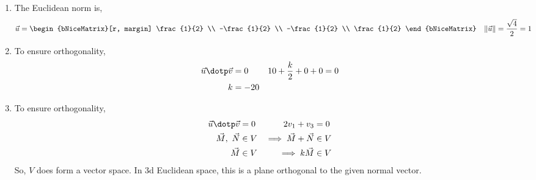 \begin{enumerate}
    \item The Euclidean norm is,
          \begin{align}
              \vec{u}               & = \begin{bNiceMatrix}[r, margin]
                                            \frac{1}{2}  \\ -\frac{1}{2} \\
                                            -\frac{1}{2} \\ \frac{1}{2}
                                        \end{bNiceMatrix} &
              \lVert \vec{u} \rVert & = \frac{\sqrt{4}}{2} = 1
          \end{align}

    \item To ensure orthogonality,
          \begin{align}
              \vec{u} \dotp \vec{v}    & = 0   &
              10 + \frac{k}{2} + 0 + 0 & = 0     \\
              k                        & = -20
          \end{align}

    \item To ensure orthogonality,
          \begin{align}
              \vec{u} \dotp \vec{v}      & = 0   &
              2v_1 + v_3                 & = 0     \\
              \vec{M},\ \vec{N}          & \in V &
              \implies \vec{M} + \vec{N} & \in V   \\
              \vec{M}                    & \in V &
              \implies k\vec{M}          & \in V
          \end{align}
          So, $ V $ does form a vector space. In 3d Euclidean space, this is a plane
          orthogonal to the given normal vector.


\end{enumerate}
